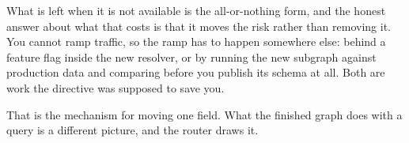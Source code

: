 What is left when it is not available is the all-or-nothing form, and the honest
answer about what that costs is that it moves the risk rather than removing it.
You cannot ramp traffic, so the ramp has to happen somewhere else: behind a
feature flag inside the new resolver, or by running the new subgraph against
production data and comparing before you publish its schema at all. Both are
work the directive was supposed to save you.

\medskip
That is the mechanism for moving one field. What the finished graph does with a
query is a different picture, and the router draws it.

%
